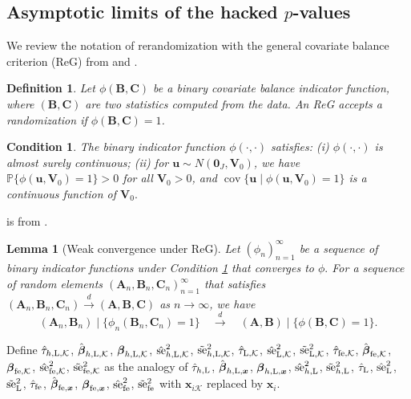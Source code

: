 \documentclass[12pt]{article}
\newtheorem{lemma}{Lemma}
\newtheorem{definition}{Definition}
\newtheorem{condition}{Condition}
\newcommand{\se}{\textnormal{se}}
\newcommand{\Lin}{\textnormal{L}}
\newcommand{\Prob}{\mathbb{P}}
\newcommand{\cov}{\operatorname{cov}}
\newcommand{\wconv}{\stackrel{d}{\rightarrow}}
\newcommand{\mk}{\mathcal{K}}
\newcommand{\fe}{\textnormal{fe}}
\newcommand{\bs}{\boldsymbol}
\begin{document}
\subsection{Asymptotic limits of the hacked $p$-values}

We review the notation of rerandomization with the general covariate balance criterion
(ReG) from \cite{Li9157} and \cite{zdrep}.
\begin{definition}
    Let $\phi(\bs{B},\bs{C})$ be a binary covariate balance indicator function, where $(\bs{B}, \bs{C})$ are two statistics computed from the data. An ReG accepts a randomization
if $\phi(\bs{B},\bs{C})=1$.
\end{definition}

\begin{condition}
\label{a:conditon-for-indicator-function}
    The binary indicator function $\phi(\cdot,\cdot)$ satisfies: (i) $\phi(\cdot,\cdot)$ is almost surely continuous; (ii) for $\bs{u}\sim N(\bs{0}_J,\bs{V}_0)$, we have $\Prob\{\phi(\bs{u},\bs{V}_0)=1\}>0$ for all $\bs{V}_0>0$, and $\cov\{\bs{u}\mid\phi(\bs{u},\bs{V}_0)=1\}$ is a continuous function of $\bs{V}_0.$
\end{condition}

 is from \citet[][Lemma S7]{zdrep}.

\begin{lemma}[Weak convergence under ReG]
\label{lem:weak-convergence-under-ReG}
    Let $(\phi_n)_{n= 1}^\infty$ be a sequence of binary indicator functions under Condition \ref{a:conditon-for-indicator-function} that converges to $\phi.$ For a sequence of random elements $(\bs{A}_n,\bs{B}_n,\bs{C}_n)_{n=1}^\infty$ that satisfies $(\bs{A}_{n},\bs{B}_{n},\bs{C}_{n})\wconv(\bs{A},\bs{B},\bs{C})$ as $n\to\infty$, we have
$$(\bs{A}_n,\bs{B}_n)\mid\{\phi_n(\bs{B}_n,\bs{C}_n)=1\}\quad\wconv\quad(\bs{A},\bs{B})\mid\{\phi(\bs{B},\bs{C})=1\}.$$
\end{lemma}

Define $\hat{\tau}_{h, \Lin, \mk}$, $\hat{\bs{\beta}}_{h,\Lin,\mk}$, $\bs{\beta}_{h,\Lin,\mk}$, $\hat{\se}_{h,\Lin,\mk}^2$, $\tilde{\se}_{h,\Lin,\mk}^2$, $\hat{\tau}_{\Lin, \mk}$,  $\hat{\se}_{\Lin,\mk}^2$, $\tilde{\se}_{\Lin,\mk}^2$, $\hat{\tau}_{\fe , \mk}$, $\hat{\bs{\beta}}_{\fe ,\mk}$, $\bs{\beta}_{\fe ,\mk}$, $\hat{\se}_{\fe ,\mk}^2$, $\tilde{\se}_{\fe ,\mk}^2$ as the analogy of $\hat{\tau}_{h, \Lin}$, $\hat{\bs{\beta}}_{h,\Lin,\bs{x}}$, $\bs{\beta}_{h, \Lin , \bs{x}}$, $\hat{\se}_{h,\Lin}^2$, $\tilde{\se}_{h,\Lin}^2$, $\hat{\tau}_{\Lin}$, $\hat{\se}_{\Lin}^2$, $\tilde{\se}_{\Lin}^2$, $\hat{\tau}_{\fe }$, $\hat{\bs{\beta}}_{\fe, \bs{x}}$, $\bs{\beta}_{\fe, \bs{x}}$, $\hat{\se}_{\fe }^2$, $\tilde{\se}_{\fe }^2$ with $\bs{x}_{i\mk}$ replaced by $\bs{x}_i$.
\end{document}
